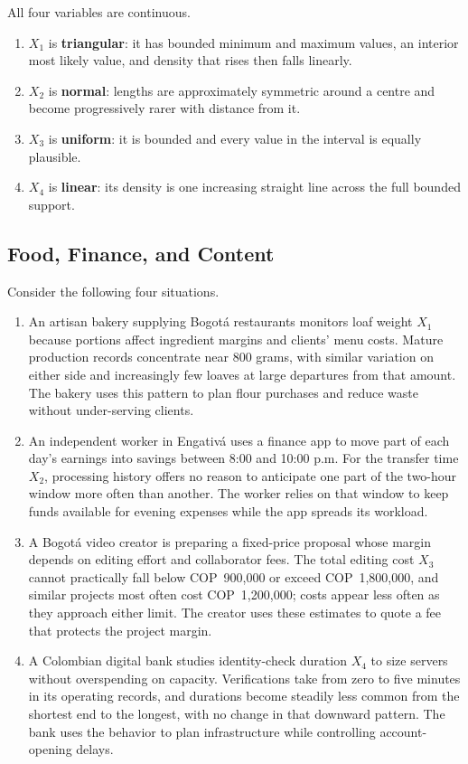 	All four variables are continuous.
	\begin{enumerate}
		\item $X_1$ is \textbf{triangular}: it has bounded minimum and maximum values, an interior most likely value, and density that rises then falls linearly.
		\item $X_2$ is \textbf{normal}: lengths are approximately symmetric around a centre and become progressively rarer with distance from it.
		\item $X_3$ is \textbf{uniform}: it is bounded and every value in the interval is equally plausible.
		\item $X_4$ is \textbf{linear}: its density is one increasing straight line across the full bounded support.
	\end{enumerate}


	\subsection{Food, Finance, and Content}
	\label{sec:food-finance-content}

	Consider the following four situations.

	\begin{enumerate}
		\item An artisan bakery supplying Bogotá restaurants monitors loaf weight \(X_1\) because portions affect ingredient margins and clients' menu costs. Mature production records concentrate near 800 grams, with similar variation on either side and increasingly few loaves at large departures from that amount. The bakery uses this pattern to plan flour purchases and reduce waste without under-serving clients.
		\item An independent worker in Engativá uses a finance app to move part of each day's earnings into savings between 8:00 and 10:00 p.m. For the transfer time \(X_2\), processing history offers no reason to anticipate one part of the two-hour window more often than another. The worker relies on that window to keep funds available for evening expenses while the app spreads its workload.
		\item A Bogotá video creator is preparing a fixed-price proposal whose margin depends on editing effort and collaborator fees. The total editing cost \(X_3\) cannot practically fall below COP~900,000 or exceed COP~1,800,000, and similar projects most often cost COP~1,200,000; costs appear less often as they approach either limit. The creator uses these estimates to quote a fee that protects the project margin.
		\item A Colombian digital bank studies identity-check duration \(X_4\) to size servers without overspending on capacity. Verifications take from zero to five minutes in its operating records, and durations become steadily less common from the shortest end to the longest, with no change in that downward pattern. The bank uses the behavior to plan infrastructure while controlling account-opening delays.
	\end{enumerate}

